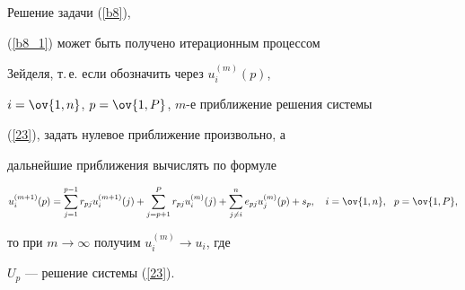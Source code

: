 \begin{note}


Решение задачи (\ref{b8}),


(\ref{b8_1}) может быть получено итерационным процессом


Зейделя, т.\,е. если обозначить через $u_{i}^{(m)}(p)$,


$i=\ov{1,n}$, $p=\ov{1,P}$, $m$-е приближение решения системы


(\ref{23}), задать нулевое приближение произвольно, а


дальнейшие приближения вычислять по формуле


\begin{equation}\label{108}


u_{i}^{(m+1)}(p) =\sum_{j = 1}^{p-1}r_{pj}u_{i}^{(m+1)}(j)


+\sum_{j = p+1}^{P}r_{pj}u_{i}^{(m)}(j)


+\sum_{j\ne i}^n e_{pj} u_{j}^{(m)} (p) + s_{p},


\quad i=\ov{1,n},\ \ p=\ov{1,P},


\end{equation}


то при $m \to \infty$ получим $u^{(m)}_i \to u_i$, где


$U_p$ --- решение системы (\ref{23}).


\end{note}








